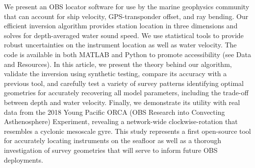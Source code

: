 We present an OBS locator software for use by the marine geophysics community that can account for ship velocity, GPS-transponder offset, and ray bending. Our efficient inversion algorithm provides station location in three dimensions and solves for depth-averaged water sound speed. We use statistical tools to provide robust uncertainties on the instrument location as well as water velocity. The code is available in both MATLAB and Python to promote accessibility (see Data and Resources). In this article, we present the theory behind our algorithm, validate the inversion using synthetic testing, compare its accuracy with a previous tool, and carefully test a variety of survey patterns identifying optimal geometries for accurately recovering all model parameters, including the trade-off between depth and water velocity. Finally, we demonstrate its utility with real data from the 2018 Young Pacific ORCA (OBS Research into Convecting Asthenosphere) Experiment, revealing a network-wide clockwise-rotation that resembles a cyclonic mesoscale gyre. This study represents a first open-source tool for accurately locating instruments on the seafloor as well as a thorough investigation of survey geometries that will serve to inform future OBS deployments.